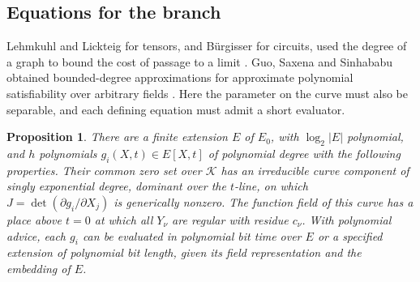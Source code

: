 \documentclass[11pt,letterpaper]{article}
\newtheorem{proposition}[theorem]{Proposition}
\theoremstyle{definition}
\numberwithin{equation}{section}
\begin{document}
\subsection{Equations for the branch}

Lehmkuhl and Lickteig for tensors, and Bürgisser for circuits, used the degree of a graph
to bound the cost of passage to a limit \cite{LehmkuhlLickteig,ApproxFactors}. Guo, Saxena and Sinhababu obtained
bounded-degree approximations for approximate polynomial satisfiability over arbitrary
fields \cite[Theorem 4.2]{GSS}. Here the parameter on the curve must also be separable, and each
defining equation must admit a short evaluator.

\begin{proposition}\label{thm:branch}
There are a finite extension $E$ of $E_0$, with $\log_2|E|$ polynomial, and $h$
polynomials $g_i(X,t)\in E[X,t]$ of polynomial degree with the following properties. Their
common zero set over $\mathcal{K}$ has an irreducible curve component of singly exponential degree,
dominant over the $t$-line, on which $J=\det(\partial g_i/\partial X_j)$ is generically nonzero. The function
field of this curve has a place above $t=0$ at which all $Y_\nu$ are regular with residue $c_\nu$. With
polynomial advice, each $g_i$ can be evaluated in polynomial bit time over $E$ or a specified
extension of polynomial bit length, given its field representation and the embedding of $E$.
\end{proposition}
\end{document}
